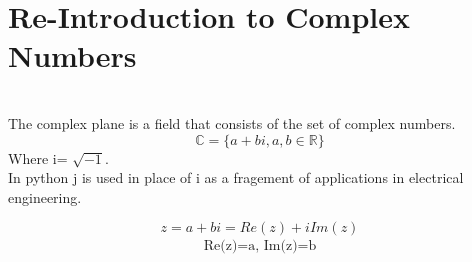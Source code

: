 \documentclass[12pt,a4paper]{article}
\begin{document}
\section{Re-Introduction to Complex Numbers}\\
The complex plane is a field that consists of the set of complex numbers.
\\
\[
  \mathbb{C}=\{a+bi, a,b \in \mathbb{R}\}
\]
Where i= $\sqrt{-1}$. \\
In python j is used in place of i as a fragement of applications in electrical engineering.

\[
  z=a+bi= Re(z)+iIm(z)
\]
\begin{align*}
  \text{Re(z)=a, Im(z)=b}
\end{align*}
\end{document}
